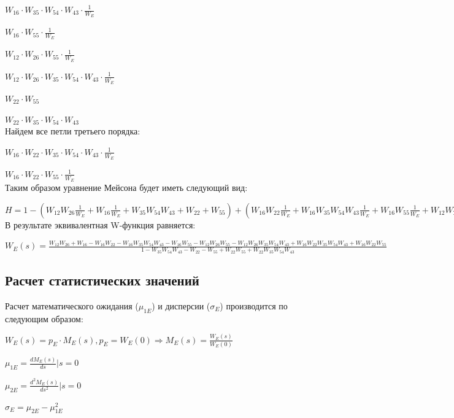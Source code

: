 $W_{16}\cdot W_{35}\cdot W_{54}\cdot W_{43}\cdot \frac{1}{W_E}$

$W_{16}\cdot W_{55}\cdot \frac{1}{W_E}$

$W_{12}\cdot W_{26}\cdot W_{55}\cdot \frac{1}{W_E}$ 

$W_{12}\cdot W_{26}\cdot W_{35}\cdot W_{54}\cdot W_{43}\cdot \frac{1}{W_E}$

$W_{22}\cdot W_{55}$

$W_{22}\cdot W_{35}\cdot W_{54} \cdot W_{43}$\\

Найдем все петли третьего порядка:

$W_{16}\cdot W_{22}\cdot W_{35}\cdot W_{54}\cdot W_{43}\cdot \frac{1}{W_E}$

$W_{16}\cdot W_{22}\cdot W_{55}\cdot \frac{1}{W_E}$\\

Таким образом уравнение Мейсона будет иметь следующий вид:

$H=1-(W_{12}W_{26}\frac{1}{W_E}+W_{16}\frac{1}{W_E}+W_{35}W_{54}W_{43}+W_{22}+W_{55})+(W_{16}W_{22}\frac{1}{W_E}+W_{16}W_{35}W_{54}W_{43}\frac{1}{W_E}+W_{16}W_{55}\frac{1}{W_E}+W_{12}W_{26}W_{55}\frac{1}{W_E}+W_{12}W_{26}W_{35}W_{54}W_{43}\frac{1}{W_E}+W_{22}W_{55}+W_{22}W_{35}W_{54} W_{43})-(W_{16}W_{22}W_{35}W_{54}W_{43}\frac{1}{W_E}+W_{16}W_{22}W_{55}\frac{1}{W_E})$\\

В результате эквивалентная W-функция равняется:

$W_E(s)=\frac{W_{12}W_{26}+W_{16}-W_{16}W_{22}-W_{16}W_{35}W_{54}W_{43}-W_{16}W_{55}-W_{12}W_{26}W_{55}-W_{12}W_{26}W_{35}W_{54}W_{43}+W_{16}W_{22}W_{35}W_{54}W_{43}+W_{16}W_{22}W_{55}}{1-W_{35}W_{54}W_{43}-W_{22}-W_{55}+W_{22}W_{55}+W_{22}W_{35}W_{54} W_{43}}$\\

\subsection{Расчет статистических значений}

Расчет математического ожидания ($\mu_{1E}$) и дисперсии ($\sigma_E$) производится по следующим образом:

$W_E(s)=p_E\cdot M_E(s), p_E=W_E(0)\Longrightarrow M_E(s)=\frac{W_E(s)}{W_E(0)}$

$\mu_{1E}=\frac{d M_E(s)}{ds}|s=0$

$\mu_{2E}=\frac{d^2 M_E(s)}{ds^2}|s=0$

$\sigma_E=\mu_{2E}-\mu_{1E}^2$\\


